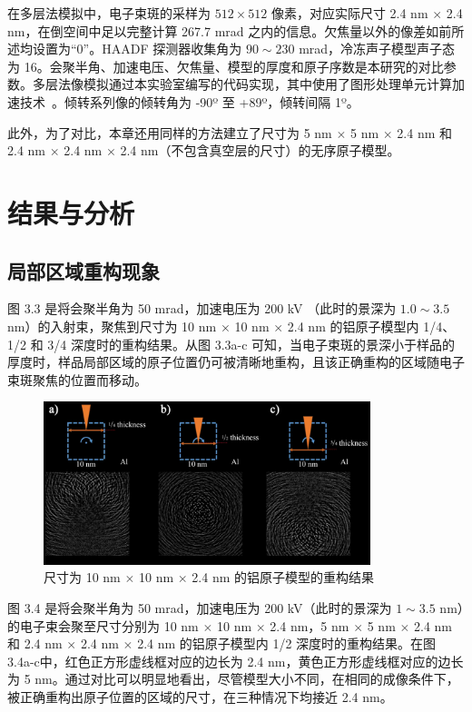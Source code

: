 在多层法模拟中，电子束斑的采样为 $512\times 512$ 像素，对应实际尺寸 2.4 nm $\times$ 2.4 nm，在倒空间中足以完整计算 267.7 mrad 之内的信息。欠焦量以外的像差如前所述均设置为“0”。HAADF 探测器收集角为 $90\sim230$ mrad，冷冻声子模型声子态为 16。会聚半角、加速电压、欠焦量、模型的厚度和原子序数是本研究的对比参数。多层法像模拟通过本实验室编写的代码实现，其中使用了图形处理单元计算加速技术~\cite{MWQ2018}。倾转系列像的倾转角为 -90º 至 +89º，倾转间隔 1º。

此外，为了对比，本章还用同样的方法建立了尺寸为 5 nm $\times$ 5 nm $\times$ 2.4 nm 和 2.4 nm $\times$ 2.4 nm $\times$ 2.4 nm（不包含真空层的尺寸）的无序原子模型。

\section{结果与分析}
\subsection{局部区域重构现象}
图 3.3 是将会聚半角为 50 mrad，加速电压为 200 kV （此时的景深为 $1.0 \sim 3.5$  nm）的入射束，聚焦到尺寸为 10 nm $\times$ 10 nm $\times$ 2.4 nm 的铝原子模型内 1/4、1/2 和 3/4 深度时的重构结果。从图 3.3a-c 可知，当电子束斑的景深小于样品的厚度时，样品局部区域的原子位置仍可被清晰地重构，且该正确重构的区域随电子束斑聚焦的位置而移动。

\begin{figure}[H]
	\vspace{\baselineskip}
	\centering
	\includegraphics[width=0.85\textwidth]{../4.2/42}
	\caption{尺寸为 10 nm $\times$ 10 nm $\times$ 2.4 nm 的铝原子模型的重构结果}\label{fig:42}
	\song{}
\end{figure}

图 3.4 是将会聚半角为 50 mrad，加速电压为 200 kV（此时的景深为 $1\sim3.5$ nm）的电子束会聚至尺寸分别为 10 nm $\times$ 10 nm $\times$ 2.4 nm，5 nm $\times$ 5 nm $\times$ 2.4 nm 和 2.4 nm $\times$ 2.4 nm $\times$ 2.4 nm 的铝原子模型内 1/2 深度时的重构结果。在图 3.4a-c中，红色正方形虚线框对应的边长为 2.4 nm，黄色正方形虚线框对应的边长为 5 nm。通过对比可以明显地看出，尽管模型大小不同，在相同的成像条件下，被正确重构出原子位置的区域的尺寸，在三种情况下均接近 2.4 nm。

